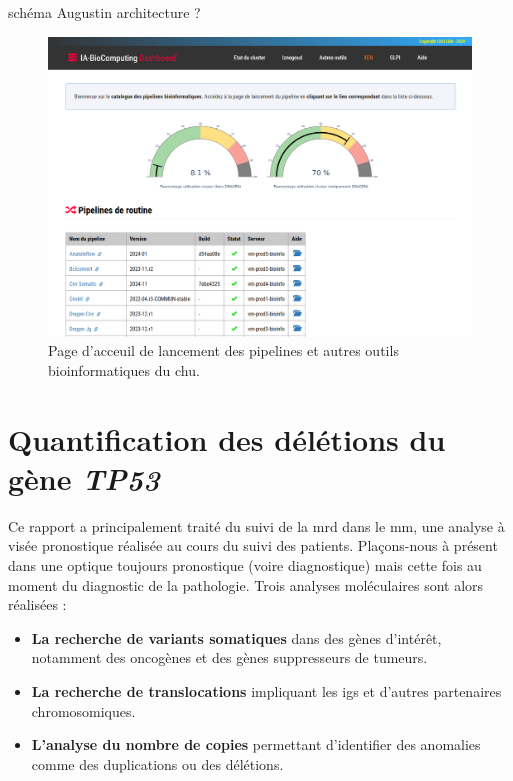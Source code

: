 schéma Augustin architecture ?


\begin{figure}[H]
    \centering
    \includegraphics[width=1\textwidth]{images/dashboard_bioinfo.png}
    \caption{
        Page d'acceuil de lancement des pipelines et autres outils bioinformatiques du \gls{chu}.
    }
    \label{fig:bioinfo-dashboard}
\end{figure}

\section{Quantification des délétions du gène \textit{TP53}}

Ce rapport a principalement traité du suivi de la \gls{mrd} dans le \gls{mm},
une analyse à visée pronostique réalisée au cours du suivi des patients.
Plaçons-nous à présent dans une optique toujours pronostique (voire
diagnostique) mais cette fois au moment du diagnostic de la pathologie. Trois
analyses moléculaires sont alors réalisées :

\begin{itemize}
    \item \textbf{La recherche de variants somatiques} dans des gènes
          d'intérêt, notamment des oncogènes et des gènes suppresseurs de
          tumeurs.
    \item \textbf{La recherche de translocations} impliquant les \glspl{ig} et
          d'autres partenaires chromosomiques.
    \item \textbf{L'analyse du nombre de copies} permettant d'identifier des
          anomalies comme des duplications ou des délétions.
\end{itemize}

